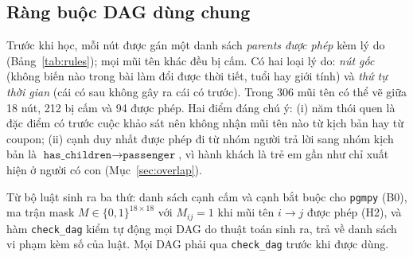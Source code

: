 \documentclass[pdflatex,sn-mathphys-num]{sn-jnl}%
\newcommand{\var}[1]{\texttt{#1}}                 %
\begin{document}
\subsection{Ràng buộc DAG dùng chung}\label{sec:rules}

Trước khi học, mỗi nút được gán một danh sách \emph{parents được phép} kèm lý do (Bảng~\ref{tab:rules}); mọi mũi tên khác đều bị cấm. Có hai loại lý do: \emph{nút gốc} (không biến nào trong bài làm đổi được thời tiết, tuổi hay giới tính) và \emph{thứ tự thời gian} (cái có sau không gây ra cái có trước). Trong 306 mũi tên có thể vẽ giữa 18 nút, 212 bị cấm và 94 được phép. Hai điểm đáng chú ý: (i) năm thói quen là đặc điểm có trước cuộc khảo sát nên không nhận mũi tên nào từ kịch bản hay từ coupon; (ii) cạnh duy nhất được phép đi từ nhóm người trả lời sang nhóm kịch bản là $\var{has\_children} \to \var{passenger}$, vì hành khách là trẻ em gần như chỉ xuất hiện ở người có con (Mục~\ref{sec:overlap}).

Từ bộ luật sinh ra ba thứ: danh sách cạnh cấm và cạnh bắt buộc cho \texttt{pgmpy} (B0), ma trận mask $M \in \{0,1\}^{18\times18}$ với $M_{ij}=1$ khi mũi tên $i \to j$ được phép (H2), và hàm \texttt{check\_dag} kiểm tự động mọi DAG do thuật toán sinh ra, trả về danh sách vi phạm kèm số của luật. Mọi DAG phải qua \texttt{check\_dag} trước khi được dùng.
\end{document}
